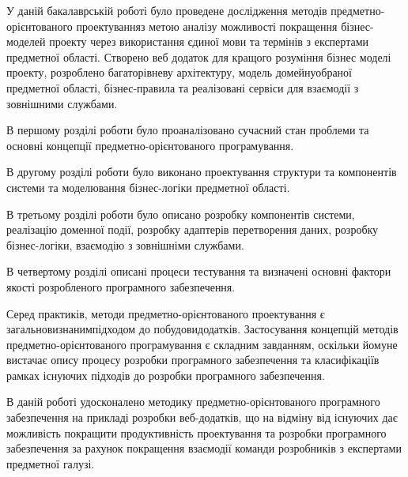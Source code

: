 
У даній бакалаврській роботі було проведене дослідження
методів предметно-орієнтованого проектуванняз метою аналізу
можливості покращення бізнес-моделей проекту через
використання єдиної мови та термінів з експертами предметної
області. Створено веб додаток для кращого розуміння бізнес
моделі проекту, розроблено багаторівневу архітектуру,
модель домейнуобраної предметної області, бізнес-правила
та реалізовані сервіси для взаємодії з зовнішними службами.

В першому розділі роботи було проаналізовано сучасний
стан проблеми та основні концепції предметно-орієнтованого програмування.

В другому розділі роботи було виконано проектування структури
та компонентів системи та моделювання бізнес-логіки предметної області.

В третьому розділі роботи було описано розробку компонентів системи,
реалізацію доменної події, розробку адаптерів перетворення даних,
розробку бізнес-логіки, взаємодію з зовнішніми службами.

В четвертому розділі описані процеси тестування
та визначені основні фактори якості розробленого програмного забезпечення.

Серед практиків, методи предметно-орієнтованого проектування
є загальновизнанимпідходом до побудовидодатків.
Застосування концепцій методів предметно-орієнтованого
програмування є складним завданням, оскільки йомуне
вистачає опису процесу розробки програмного забезпечення
та класифікаціїв рамках існуючих підходів до розробки програмного забезпечення.

В даній роботі удосконалено методику предметно-орієнтованого
програмного забезпечення на прикладі розробки веб-додатків,
що на відміну від існуючих дає можливість покращити продуктивність
проектування та розробки програмного забезпечення за рахунок
покращення взаємодії команди розробників з експертами предметної галузі.
